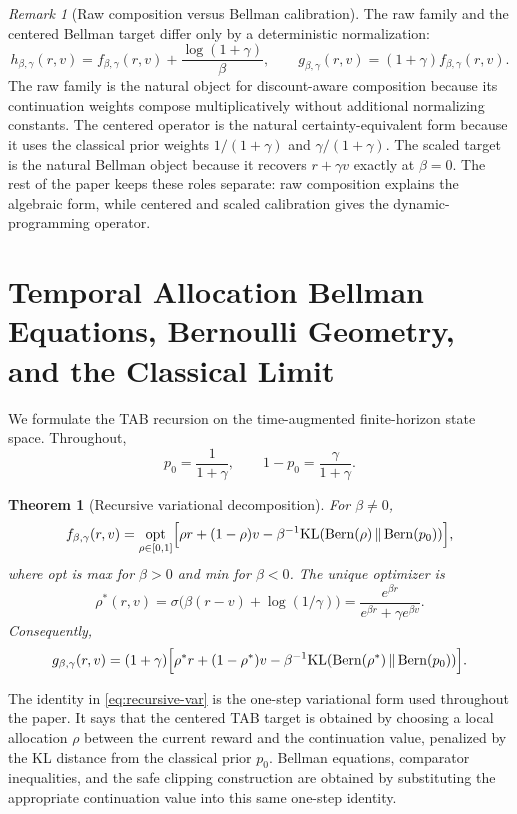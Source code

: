 \documentclass{article}
\newtheorem{theorem}{Theorem}[section]
\theoremstyle{remark}
\newtheorem{remark}[remark]{Remark}
\DeclareMathOperator{\Bern}{Bern}
\newcommand{\KL}{\mathrm{KL}}
\newcommand{\fbg}{f_{\beta,\gamma}}
\newcommand{\gbg}{g_{\beta,\gamma}}
\newcommand{\pprior}{p_0}
\newcommand{\KLbin}[2]{\KL\!\left(\Bern(#1)\,\middle\|\,\Bern(#2)\right)}
\begin{document}
\begin{remark}[Raw composition versus Bellman calibration]
\label{rem:raw-vs-centered}
The raw family and the centered Bellman target differ only by a deterministic normalization:
\[
 h_{\beta,\gamma}(r,v)=f_{\beta,\gamma}(r,v)+\frac{\log(1+\gamma)}{\beta},
 \qquad
 g_{\beta,\gamma}(r,v)=(1+\gamma)f_{\beta,\gamma}(r,v).
\]
The raw family is the natural object for discount-aware composition because its continuation weights
compose multiplicatively without additional normalizing constants. The centered operator is the
natural certainty-equivalent form because it uses the classical prior weights
$1/(1+\gamma)$ and $\gamma/(1+\gamma)$. The scaled target is the natural Bellman object because
it recovers $r+\gamma v$ exactly at $\beta=0$. The rest of the paper keeps these roles separate:
raw composition explains the algebraic form, while centered and scaled calibration gives the dynamic-
programming operator.
\end{remark}


\section{Temporal Allocation Bellman Equations, Bernoulli Geometry, and the Classical Limit}
\label{sec:bellman}

We formulate the TAB recursion on the time-augmented finite-horizon state space. Throughout,
\[
\pprior=\frac{1}{1+\gamma},
\qquad
1-\pprior=\frac{\gamma}{1+\gamma}.
\]

\begin{theorem}[Recursive variational decomposition]
\label{thm:recursive-decomposition}
For $\beta\neq 0$,
\begin{equation}
\fbg(r,v)
=
\underset{\rho\in[0,1]}{\mathrm{opt}}
\Bigl[
\rho r + (1-\rho)v - \beta^{-1}\KLbin{\rho}{\pprior}
\Bigr],
\label{eq:recursive-var}
\end{equation}
where \textnormal{opt} is \textnormal{max} for $\beta>0$ and \textnormal{min} for $\beta<0$.
The unique optimizer is
\[
\rho^*(r,v)
=
\sigma\!\bigl(\beta(r-v)+\log(1/\gamma)\bigr)
=
\frac{e^{\beta r}}{e^{\beta r}+\gamma e^{\beta v}}.
\]
Consequently,
\[
\gbg(r,v)
=
(1+\gamma)
\Bigl[
\rho^* r + (1-\rho^*)v - \beta^{-1}\KLbin{\rho^*}{\pprior}
\Bigr].
\]
\end{theorem}

The identity in \eqref{eq:recursive-var} is the one-step variational form used throughout the paper.
It says that the centered TAB target is obtained by choosing a local allocation $\rho$ between the
current reward and the continuation value, penalized by the KL distance from the classical prior
$\pprior$. Bellman equations, comparator inequalities, and the safe clipping construction are obtained
by substituting the appropriate continuation value into this same one-step identity.
\end{document}

